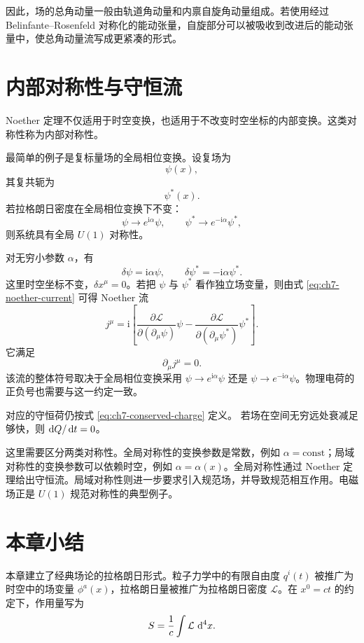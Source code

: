 因此，场的总角动量一般由轨道角动量和内禀自旋角动量组成。若使用经过 Belinfante--Rosenfeld 对称化的能动张量，自旋部分可以被吸收到改进后的能动张量中，使总角动量流写成更紧凑的形式。

\section{内部对称性与守恒流}

Noether 定理不仅适用于时空变换，也适用于不改变时空坐标的内部变换。这类对称性称为内部对称性。

最简单的例子是复标量场的全局相位变换。设复场为
\[
\psi(x),
\]
其复共轭为
\[
\psi^{*}(x).
\]
若拉格朗日密度在全局相位变换下不变：
\[
\psi\rightarrow e^{\mathrm{i}\alpha}\psi,
\qquad
\psi^{*}\rightarrow e^{-\mathrm{i}\alpha}\psi^{*},
\]
则系统具有全局 $U(1)$ 对称性。

对无穷小参数 $\alpha$，有
\[
\delta\psi=\mathrm{i}\alpha\psi,
\qquad
\delta\psi^{*}=-\mathrm{i}\alpha\psi^{*}.
\]
这里时空坐标不变，$\delta x^{\mu}=0$。若把 $\psi$ 与 $\psi^{*}$ 看作独立场变量，则由式 \eqref{eq:ch7-noether-current} 可得 Noether 流
\begin{equation}
	j^{\mu}
	=
	\mathrm{i}
	\left[
	\frac{\partial\mathcal{L}}{\partial(\partial_{\mu}\psi)}\psi
	-
	\frac{\partial\mathcal{L}}{\partial(\partial_{\mu}\psi^{*})}\psi^{*}
	\right].
	\label{eq:ch7-u1-current}
\end{equation}
它满足
\[
\partial_{\mu}j^{\mu}=0.
\]
该流的整体符号取决于全局相位变换采用 $\psi\rightarrow e^{\mathrm{i}\alpha}\psi$ 还是 $\psi\rightarrow e^{-\mathrm{i}\alpha}\psi$。物理电荷的正负号也需要与这一约定一致。

对应的守恒荷仍按式 \eqref{eq:ch7-conserved-charge} 定义。
若场在空间无穷远处衰减足够快，则 $\mathop{}\!\mathrm{d} Q/\mathop{}\!\mathrm{d} t=0$。

这里需要区分两类对称性。全局对称性的变换参数是常数，例如 $\alpha=\mathrm{const}$；局域对称性的变换参数可以依赖时空，例如 $\alpha=\alpha(x)$。全局对称性通过 Noether 定理给出守恒流。局域对称性则进一步要求引入规范场，并导致规范相互作用。电磁场正是 $U(1)$ 规范对称性的典型例子。

\section{本章小结}

本章建立了经典场论的拉格朗日形式。粒子力学中的有限自由度 $q^{i}(t)$ 被推广为时空中的场变量 $\phi^{a}(x)$，拉格朗日量被推广为拉格朗日密度 $\mathcal{L}$。在 $x^{0}=ct$ 的约定下，作用量写为
\[
S=\frac{1}{c}\int \mathcal{L}\,\mathop{}\!\mathrm{d}^{4}x.
\]

